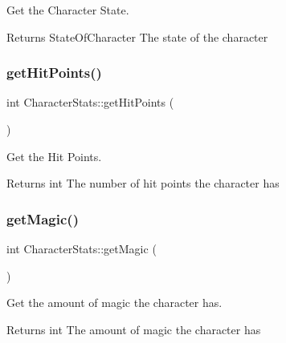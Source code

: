 Get the Character State. 

\begin{DoxyReturn}{Returns}
State\+Of\+Character The state of the character 
\end{DoxyReturn}
\mbox{\label{classCharacterStats_a9b22b4a1fcafe1a16f3883547eb5d9bc}} 
\subsubsection{\texorpdfstring{getHitPoints()}{getHitPoints()}}
{\footnotesize\ttfamily int Character\+Stats\+::get\+Hit\+Points (\begin{DoxyParamCaption}{ }\end{DoxyParamCaption})\hspace{0.3cm}{\ttfamily [inline]}}



Get the Hit Points. 

\begin{DoxyReturn}{Returns}
int The number of hit points the character has 
\end{DoxyReturn}
\mbox{\label{classCharacterStats_a96f79ff2af072daba294d8e04f9d29a4}} 
\subsubsection{\texorpdfstring{getMagic()}{getMagic()}}
{\footnotesize\ttfamily int Character\+Stats\+::get\+Magic (\begin{DoxyParamCaption}{ }\end{DoxyParamCaption})\hspace{0.3cm}{\ttfamily [inline]}}



Get the amount of magic the character has. 

\begin{DoxyReturn}{Returns}
int The amount of magic the character has 
\end{DoxyReturn}
\mbox{\label{classCharacterStats_af7dcfe803978f4a84ea87f881d857c58}} 
